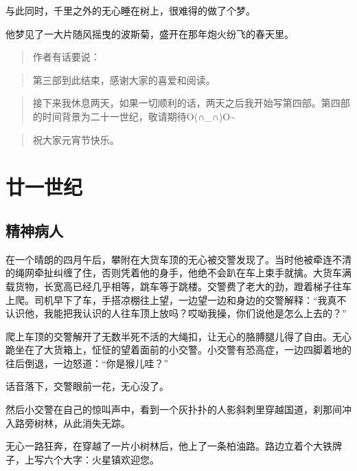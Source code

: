 与此同时，千里之外的无心睡在树上，很难得的做了个梦。

他梦见了一大片随风摇曳的波斯菊，盛开在那年炮火纷飞的春天里。

\begin{quote}
作者有话要说：
\end{quote}

\begin{quote}
\end{quote}

\begin{quote}
第三部到此结束，感谢大家的喜爱和阅读。
\end{quote}

\begin{quote}
\end{quote}

\begin{quote}
接下来我休息两天，如果一切顺利的话，两天之后我开始写第四部。第四部的时间背景为二十一世纪，敬请期待O(∩\_∩)O\textasciitilde{}
\end{quote}

\begin{quote}
祝大家元宵节快乐。
\end{quote}

\part{廿一世纪}

\chapter{精神病人}

在一个晴朗的四月午后，攀附在大货车顶的无心被交警发现了。当时他被牵连不清的绳网牵扯纠缠了住，否则凭着他的身手，他绝不会趴在车上束手就擒。大货车满载货物，长宽高已经几乎相等，跳车等于跳楼。交警费了老大的劲，蹬着梯子往车上爬。司机早下了车，手搭凉棚往上望，一边望一边和身边的交警解释：``我真不认识他，我能把我认识的人往车顶上放吗？哎呦我操，你们说他是怎么上去的？''

爬上车顶的交警解开了无数半死不活的大绳扣，让无心的胳膊腿儿得了自由。无心跪坐在了大货箱上，怔怔的望着面前的小交警。小交警有恐高症，一边四脚着地的往后倒退，一边怒道：``你是猴儿哇？''

话音落下，交警眼前一花，无心没了。

然后小交警在自己的惊叫声中，看到一个灰扑扑的人影斜刺里穿越国道，刹那间冲入路旁树林，从此消失无踪。

无心一路狂奔，在穿越了一片小树林后，他上了一条柏油路。路边立着个大铁牌子，上写六个大字：火星镇欢迎您。

